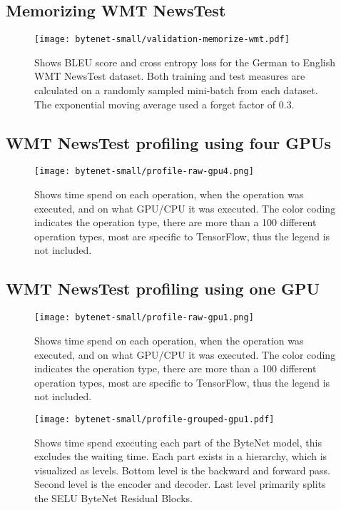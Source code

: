 \subsection{Memorizing WMT NewsTest}
\begin{figure}[h]
    \centering
    \texttt{[image: bytenet-small/validation-memorize-wmt.pdf]}
    \caption{Shows BLEU score and cross entropy loss for the German to English WMT NewsTest dataset. Both training and test measures are calculated on a randomly sampled mini-batch from each dataset. The exponential moving average used a forget factor of $0.3$.}
\end{figure}
\clearpage

\subsection{WMT NewsTest profiling using four GPUs}
\begin{figure}[h]
    \centering
    \texttt{[image: bytenet-small/profile-raw-gpu4.png]}
    \caption{Shows time spend on each operation, when the operation was executed, and on what GPU/CPU it was executed. The color coding indicates the operation type, there are more than a 100 different operation types, most are specific to TensorFlow, thus the legend is not included.}
\end{figure}
\clearpage


\subsection{WMT NewsTest profiling using one GPU}
\begin{figure}[h]
    \centering
    \texttt{[image: bytenet-small/profile-raw-gpu1.png]}
    \caption{Shows time spend on each operation, when the operation was executed, and on what GPU/CPU it was executed. The color coding indicates the operation type, there are more than a 100 different operation types, most are specific to TensorFlow, thus the legend is not included.}
\end{figure}

\begin{figure}[h]
    \centering
    \texttt{[image: bytenet-small/profile-grouped-gpu1.pdf]}
    \caption{Shows time spend executing each part of the ByteNet model, this excludes the waiting time. Each part exists in a hierarchy, which is visualized as levels. Bottom level is the backward and forward pass. Second level is the encoder and decoder. Last level primarily splits the SELU ByteNet Residual Blocks.}
\end{figure}

